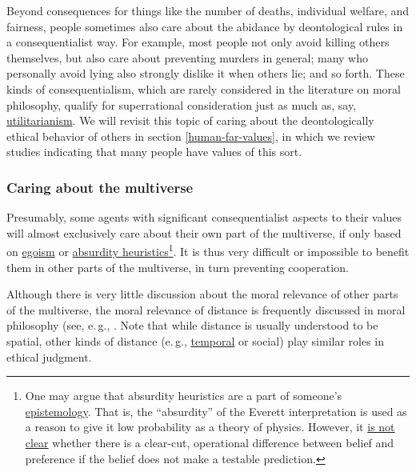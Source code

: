 Beyond consequences for things like the number of deaths, individual
welfare, and fairness, people sometimes also care about the abidance by
deontological rules in a consequentialist way. For example, most people
not only avoid killing others themselves, but also care about preventing
murders in general; many who personally avoid lying also strongly
dislike it when others lie; and so forth. These kinds of
consequentialism, which are rarely considered in the literature on moral
philosophy, qualify for superrational consideration just as much as,
say,
\href{https://en.wikipedia.org/wiki/Utilitarianism}{utilitarianism}.
We will revisit this topic of caring about the deontologically ethical
behavior of others in section
\ref{human-far-values}, in
which we review studies indicating that many people have values of this
sort.

\hypertarget{caring-about-the-multiverse}{\subsubsection{Caring about
the multiverse}\label{caring-about-the-multiverse}}

Presumably, some agents with significant consequentialist aspects to
their values will almost exclusively care about their own part of the
multiverse, if only based on
\href{https://en.wikipedia.org/wiki/Ethical_egoism}{egoism} or
\href{https://wiki.lesswrong.com/wiki/Absurdity_heuristic}{absurdity
heuristics}\footnote{One may argue that absurdity heuristics are a part
  of someone's
  \href{https://en.wikipedia.org/wiki/Epistemology}{epistemology}.
  That is, the ``absurdity'' of the Everett interpretation is used as a
  reason to give it low probability as a theory of physics. However, it
  \href{http://reducing-suffering.org/why-does-physics-exist/\#My_new_understanding}{is
  not clear} whether there is a clear-cut, operational difference
  between belief and preference if the belief does not make a testable
  prediction.}. It is thus very difficult or impossible to benefit them
in other parts of the multiverse, in turn preventing cooperation.

Although there is very little discussion about the moral relevance of
other parts of the multiverse, the moral relevance of distance is
frequently discussed in moral philosophy (see, e.\,g.,
\citet{Brock2013-cv}. Note that while distance is
usually understood to be spatial, other kinds of distance (e.\,g.,
\href{https://sentience-politics.org/philosophy/the-importance-of-the-future/}{temporal}
\parencite{Beckstead2013-lv} or social) play similar roles
in ethical judgment.

